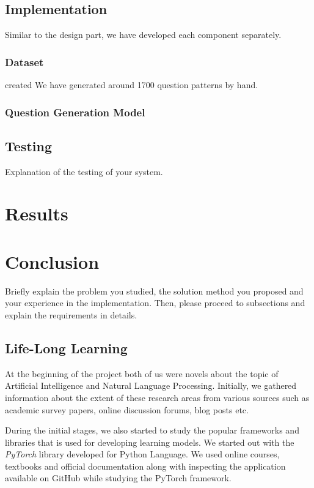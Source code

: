 \documentclass{mefsdp}
\begin{document}
	\subsection{Implementation}
	Similar to the design part, we have developed each component separately.
	\subsubsection{Dataset}
	
	created We have generated around 1700 question patterns by hand.
	\subsubsection{Question Generation Model}
	\subsection{Testing}
	Explanation of the testing of your system.
	
	\section{Results}
	
	
	\section{Conclusion}
	Briefly explain the problem you studied, the solution method you proposed and your experience in the implementation. Then, please proceed to subsections and explain the requirements in details. 
	
	\subsection{Life-Long Learning}
	At the beginning of the project both of us were novels about the topic of Artificial Intelligence and Natural Language Processing. Initially, we gathered information about the extent of these research areas from various sources such as academic survey papers, online discussion forums, blog posts etc. \newline \par
	
	During the initial stages, we also started to study the popular frameworks and libraries that is used for developing learning models. We started out with the \textit{PyTorch} library developed for Python Language. We used online courses, textbooks and official documentation along with inspecting the application available on GitHub while studying the PyTorch framework.
	
\end{document}
